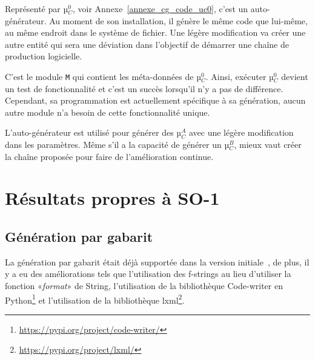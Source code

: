 Représenté par µ$_C^0$, voir Annexe~\ref{annexe_cg_code_uc0}, c’est un auto-générateur. Au moment de son installation, il génère le même code que lui-même, au même endroit dans le système de fichier. Une légère modification va créer une autre entité qui sera une déviation dans l’objectif de démarrer une chaîne de production logicielle.

C'est le module \texttt{M} qui contient les méta-données de µ$_C^0$. Ainsi, exécuter µ$_C^0$ devient un test de fonctionnalité et c'est un succès lorsqu'il n'y a pas de différence. Cependant, sa programmation est actuellement spécifique à sa génération, aucun autre module n’a besoin de cette fonctionnalité unique.




L'auto-générateur est utilisé pour générer des µ$_C^A$ avec une légère modification dans les paramètres. Même s'il a la capacité de générer un µ$_C^B$, mieux vaut créer la chaîne proposée pour faire de l'amélioration continue.

\section{Résultats propres à SO-1}

\subsection{Génération par gabarit}

La génération par gabarit était déjà supportée dans la version initiale~\cite{bluiksnot_repo}, de plus, il y a eu des améliorations tels que l'utilisation des f-strings au lieu d'utiliser la fonction «\textit{format}» de String, l'utilisation de la bibliothèque Code-writer en Python\footnote{\url{https://pypi.org/project/code-writer/}} et l'utilisation de la bibliothèque lxml\footnote{\url{https://pypi.org/project/lxml/}}.

